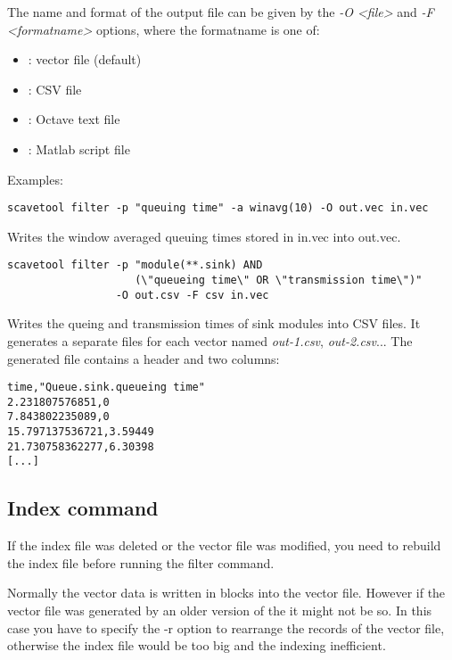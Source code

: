 The name and format of the output file can be given by the
{\itshape -O <file>} and {\itshape -F <formatname>} options, where
the formatname is one of:

\begin{itemize}
    \item{}: vector file (default)
    \item{}: CSV file
    \item{}: Octave text file
    \item{}: Matlab script file
\end{itemize}

Examples:

\begin{verbatim}
scavetool filter -p "queuing time" -a winavg(10) -O out.vec in.vec
\end{verbatim}

Writes the window averaged queuing times stored in in.vec into out.vec.

\begin{verbatim}
scavetool filter -p "module(**.sink) AND
                    (\"queueing time\" OR \"transmission time\")"
                 -O out.csv -F csv in.vec
\end{verbatim}

Writes the queing and transmission times of sink modules into CSV files.
It generates a separate files for each vector named
\textit{out-1.csv}, \textit{out-2.csv}...
The generated file contains a header and two columns:

\begin{verbatim}
time,"Queue.sink.queueing time"
2.231807576851,0
7.843802235089,0
15.797137536721,3.59449
21.730758362277,6.30398
[...]
\end{verbatim}


\subsection{Index command}

If the index file was deleted or the vector file was modified, you need to
rebuild the index file before running the filter command.

Normally the vector data is written in blocks into the vector file.
However if the vector file was generated by an older version of the 
 it might not be so. In this case you have
to specify the -r option to rearrange the records of the vector file,
otherwise the index file would be too big and the indexing inefficient.

